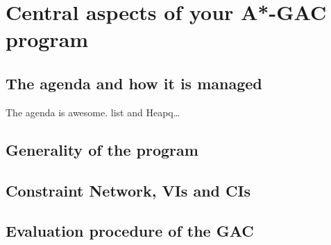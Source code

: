 
\section{Central aspects of your A*-GAC program}
\subsection{The agenda and how it is managed}
The agenda is awesome. list and Heapq\ldots

\subsection{Generality of the program}

\subsection{Constraint Network, VIs and CIs}

\subsection{Evaluation procedure of the GAC}
